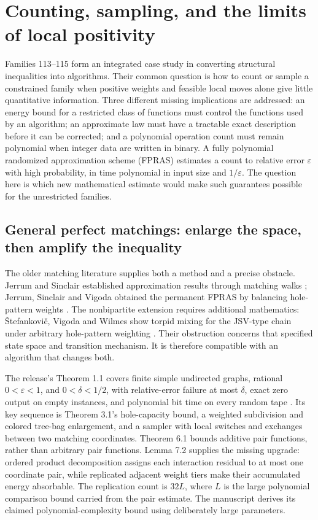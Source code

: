 \section{Counting, sampling, and the limits of local positivity}
\label{sec:frontier-counting}

Families 113--115 form an integrated case study in converting structural
inequalities into algorithms. Their common question is how to count or sample
a constrained family when positive weights and feasible local moves alone give
little quantitative information. Three different missing implications are
addressed: an energy bound for a restricted class of functions must control
the functions used by an algorithm; an approximate law must have a tractable
exact description before it can be corrected; and a polynomial operation count
must remain polynomial when integer data are written in binary.
A fully polynomial randomized approximation scheme (FPRAS) estimates a
count to relative error $\varepsilon$ with high probability, in time
polynomial in input size and $1/\varepsilon$. The question here is which
new mathematical estimate would make such guarantees possible for the
unrestricted families.

\subsection{General perfect matchings: enlarge the space, then amplify the inequality}

The older matching literature supplies both a method and a precise obstacle.
Jerrum and Sinclair established approximation results through matching walks
\cite{FrontJS1989}; Jerrum, Sinclair and Vigoda obtained the permanent FPRAS by
balancing hole-pattern weights \cite{FrontJSV2004}. The nonbipartite extension
requires additional mathematics: \v{S}tefankovi\v{c}, Vigoda and Wilmes show
torpid mixing for the JSV-type chain under arbitrary hole-pattern weighting
\cite{FrontSVW2017}. Their obstruction concerns that specified state space
and transition mechanism. It is therefore compatible with an algorithm that
changes both.

The release's Theorem 1.1 covers finite simple undirected graphs, rational
\(0<\varepsilon<1\), and \(0<\delta<1/2\), with relative-error failure at most
\(\delta\), exact zero output on empty instances, and polynomial bit time on
every random tape \cite{FrontOpenAIMatching}. Its key sequence is Theorem 3.1's
hole-capacity bound, a weighted subdivision and colored tree-bag enlargement,
and a sampler with local switches and exchanges between two matching
coordinates. Theorem 6.1 bounds additive pair functions, rather than arbitrary
pair functions. Lemma 7.2 supplies the missing upgrade: ordered product
decomposition assigns each interaction residual to at most one coordinate
pair, while replicated adjacent weight tiers make their accumulated energy
absorbable. The replication count is \(32L\), where \(L\) is the large
polynomial comparison bound carried from the pair estimate.
The manuscript derives its claimed polynomial-complexity bound using
deliberately large parameters.

